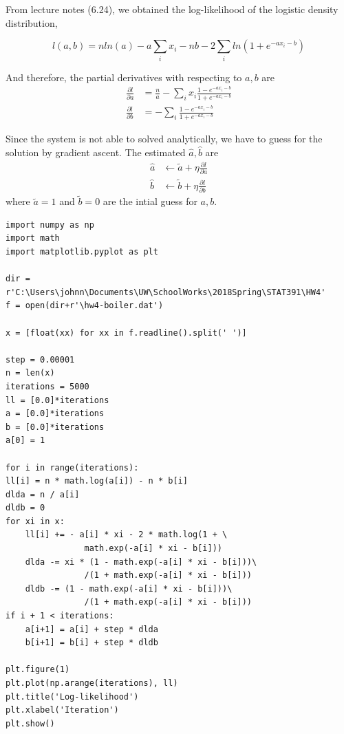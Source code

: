 \documentclass[preprint,12pt]{elsarticle}
\begin{document}
\begin{enumerate}
        From lecture notes (6.24), we obtained the log-likelihood
        of the logistic density distribution,

        \begin{equation*}
            l(a,b) = nln(a) - a\sum_{i}x_i - nb - 2\sum_{i} ln(1+e^{-ax_i-b})
        \end{equation*}

        And therefore, the partial derivatives with respecting to $a,b$  are
        \begin{align*}
            \frac{\partial l}{\partial a} &= \frac{n}{a} - \sum_{i} x_i\frac{1-e^{-ax_i-b}}{1+e^{-ax_i-b}}\\
            \frac{\partial l}{\partial b} &= -\sum_{i} \frac{1-e^{-ax_i-b}}{1+e^{-ax_i-b}}
        \end{align*}

        Since the system is not able to solved analytically, we have to guess for the 
        solution by gradient ascent. The estimated $\hat{a},\hat{b}$ are 
        \begin{align*}
            \hat{a} &\leftarrow \tilde{a} + \eta \frac{\partial l}{\partial a}\\
            \hat{b} &\leftarrow \tilde{b} + \eta \frac{\partial l}{\partial b}
        \end{align*}
        where $\tilde{a}=1$ and $\tilde{b}=0$ are the intial guess for $a,b$.

        \begin{lstlisting}
import numpy as np
import math
import matplotlib.pyplot as plt

dir = r'C:\Users\johnn\Documents\UW\SchoolWorks\2018Spring\STAT391\HW4'
f = open(dir+r'\hw4-boiler.dat')

x = [float(xx) for xx in f.readline().split(' ')]

step = 0.00001
n = len(x)
iterations = 5000
ll = [0.0]*iterations
a = [0.0]*iterations
b = [0.0]*iterations
a[0] = 1

for i in range(iterations):
ll[i] = n * math.log(a[i]) - n * b[i]
dlda = n / a[i]
dldb = 0
for xi in x:
    ll[i] += - a[i] * xi - 2 * math.log(1 + \
                math.exp(-a[i] * xi - b[i]))
    dlda -= xi * (1 - math.exp(-a[i] * xi - b[i]))\
                /(1 + math.exp(-a[i] * xi - b[i]))
    dldb -= (1 - math.exp(-a[i] * xi - b[i]))\
                /(1 + math.exp(-a[i] * xi - b[i]))
if i + 1 < iterations:
    a[i+1] = a[i] + step * dlda
    b[i+1] = b[i] + step * dldb

plt.figure(1)
plt.plot(np.arange(iterations), ll)
plt.title('Log-likelihood')
plt.xlabel('Iteration')
plt.show()


\end{lstlisting}
\end{enumerate}
\end{document}
